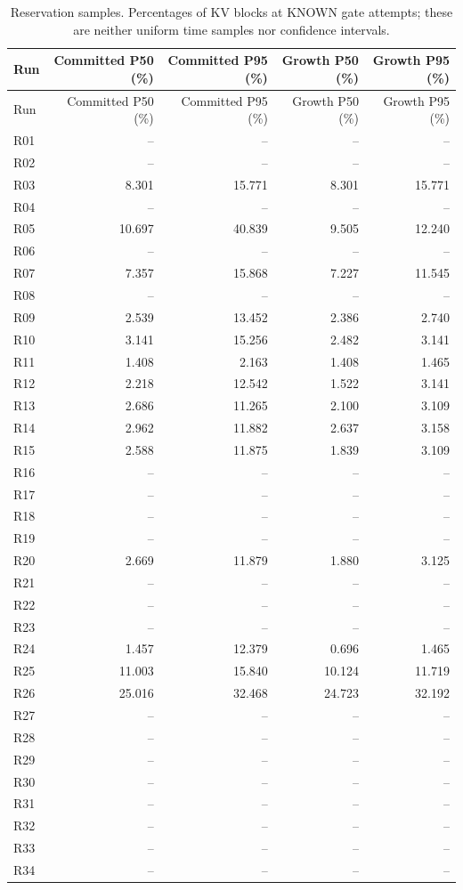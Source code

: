 \begin{longtable}{lrrrr}
\caption{Reservation samples. Percentages of KV blocks at KNOWN gate attempts; these are neither uniform time samples nor confidence intervals.}\\
\toprule
Run & Committed P50 (\%) & Committed P95 (\%) & Growth P50 (\%) & Growth P95 (\%)\\\midrule\endfirsthead
\toprule
Run & Committed P50 (\%) & Committed P95 (\%) & Growth P50 (\%) & Growth P95 (\%)\\\midrule\endhead
\bottomrule\endfoot
R01 & -- & -- & -- & --\\
R02 & -- & -- & -- & --\\
R03 & 8.301 & 15.771 & 8.301 & 15.771\\
R04 & -- & -- & -- & --\\
R05 & 10.697 & 40.839 & 9.505 & 12.240\\
R06 & -- & -- & -- & --\\
R07 & 7.357 & 15.868 & 7.227 & 11.545\\
R08 & -- & -- & -- & --\\
R09 & 2.539 & 13.452 & 2.386 & 2.740\\
R10 & 3.141 & 15.256 & 2.482 & 3.141\\
R11 & 1.408 & 2.163 & 1.408 & 1.465\\
R12 & 2.218 & 12.542 & 1.522 & 3.141\\
R13 & 2.686 & 11.265 & 2.100 & 3.109\\
R14 & 2.962 & 11.882 & 2.637 & 3.158\\
R15 & 2.588 & 11.875 & 1.839 & 3.109\\
R16 & -- & -- & -- & --\\
R17 & -- & -- & -- & --\\
R18 & -- & -- & -- & --\\
R19 & -- & -- & -- & --\\
R20 & 2.669 & 11.879 & 1.880 & 3.125\\
R21 & -- & -- & -- & --\\
R22 & -- & -- & -- & --\\
R23 & -- & -- & -- & --\\
R24 & 1.457 & 12.379 & 0.696 & 1.465\\
R25 & 11.003 & 15.840 & 10.124 & 11.719\\
R26 & 25.016 & 32.468 & 24.723 & 32.192\\
R27 & -- & -- & -- & --\\
R28 & -- & -- & -- & --\\
R29 & -- & -- & -- & --\\
R30 & -- & -- & -- & --\\
R31 & -- & -- & -- & --\\
R32 & -- & -- & -- & --\\
R33 & -- & -- & -- & --\\
R34 & -- & -- & -- & --\\
\end{longtable}
\clearpage
